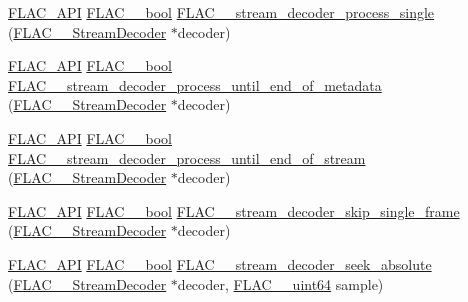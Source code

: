 \begin{DoxyCompactItemize}
\mbox{\hyperlink{group__flac__export_ga56ca07df8a23310707732b1c0007d6f5}{F\+L\+A\+C\+\_\+\+A\+PI}} \mbox{\hyperlink{ordinals_8h_a95103469f1cbd78b8cf250194985b34e}{F\+L\+A\+C\+\_\+\+\_\+bool}} \mbox{\hyperlink{group__flac__stream__decoder_ga8c4708eb2c5d99595f64dc2473aa2f42}{F\+L\+A\+C\+\_\+\+\_\+stream\+\_\+decoder\+\_\+process\+\_\+single}} (\mbox{\hyperlink{struct_f_l_a_c_____stream_decoder}{F\+L\+A\+C\+\_\+\+\_\+\+Stream\+Decoder}} $\ast$decoder)
\item 
\mbox{\hyperlink{group__flac__export_ga56ca07df8a23310707732b1c0007d6f5}{F\+L\+A\+C\+\_\+\+A\+PI}} \mbox{\hyperlink{ordinals_8h_a95103469f1cbd78b8cf250194985b34e}{F\+L\+A\+C\+\_\+\+\_\+bool}} \mbox{\hyperlink{group__flac__stream__decoder_ga5e07ca9bf67dabf2521737f63b2156e2}{F\+L\+A\+C\+\_\+\+\_\+stream\+\_\+decoder\+\_\+process\+\_\+until\+\_\+end\+\_\+of\+\_\+metadata}} (\mbox{\hyperlink{struct_f_l_a_c_____stream_decoder}{F\+L\+A\+C\+\_\+\+\_\+\+Stream\+Decoder}} $\ast$decoder)
\item 
\mbox{\hyperlink{group__flac__export_ga56ca07df8a23310707732b1c0007d6f5}{F\+L\+A\+C\+\_\+\+A\+PI}} \mbox{\hyperlink{ordinals_8h_a95103469f1cbd78b8cf250194985b34e}{F\+L\+A\+C\+\_\+\+\_\+bool}} \mbox{\hyperlink{group__flac__stream__decoder_ga4544352442870ea9f16f388a97d81dff}{F\+L\+A\+C\+\_\+\+\_\+stream\+\_\+decoder\+\_\+process\+\_\+until\+\_\+end\+\_\+of\+\_\+stream}} (\mbox{\hyperlink{struct_f_l_a_c_____stream_decoder}{F\+L\+A\+C\+\_\+\+\_\+\+Stream\+Decoder}} $\ast$decoder)
\item 
\mbox{\hyperlink{group__flac__export_ga56ca07df8a23310707732b1c0007d6f5}{F\+L\+A\+C\+\_\+\+A\+PI}} \mbox{\hyperlink{ordinals_8h_a95103469f1cbd78b8cf250194985b34e}{F\+L\+A\+C\+\_\+\+\_\+bool}} \mbox{\hyperlink{group__flac__stream__decoder_ga371bc2b4f5571e40c47f4db5a8a745f8}{F\+L\+A\+C\+\_\+\+\_\+stream\+\_\+decoder\+\_\+skip\+\_\+single\+\_\+frame}} (\mbox{\hyperlink{struct_f_l_a_c_____stream_decoder}{F\+L\+A\+C\+\_\+\+\_\+\+Stream\+Decoder}} $\ast$decoder)
\item 
\mbox{\hyperlink{group__flac__export_ga56ca07df8a23310707732b1c0007d6f5}{F\+L\+A\+C\+\_\+\+A\+PI}} \mbox{\hyperlink{ordinals_8h_a95103469f1cbd78b8cf250194985b34e}{F\+L\+A\+C\+\_\+\+\_\+bool}} \mbox{\hyperlink{group__flac__stream__decoder_ga5c1c70de72e6ed49db6d61a9131d9117}{F\+L\+A\+C\+\_\+\+\_\+stream\+\_\+decoder\+\_\+seek\+\_\+absolute}} (\mbox{\hyperlink{struct_f_l_a_c_____stream_decoder}{F\+L\+A\+C\+\_\+\+\_\+\+Stream\+Decoder}} $\ast$decoder, \mbox{\hyperlink{ordinals_8h_aa78c8c70a3eb8a58af7436f278acde8e}{F\+L\+A\+C\+\_\+\+\_\+uint64}} sample)
\end{DoxyCompactItemize}
